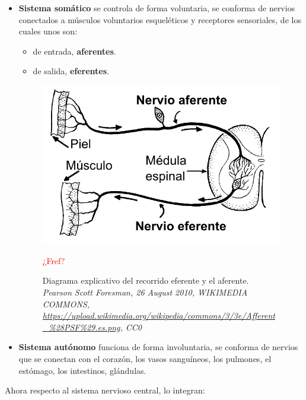 \begin{itemize}
 \item \textbf{Sistema somático} se controla de forma voluntaria, se conforma de nervios conectados a músculos voluntarios esqueléticos y receptores sensoriales, de los cuales unos son:
 \begin{itemize}
  \item de entrada, \textbf{aferentes}.
  \item de salida, \textbf{eferentes}.
 \end{itemize}


 \begin{figure}[h]
 \centering
 \includegraphics[scale=0.5]{../Figuras/afferent_efferent.png}
 \caption{Diagrama explicativo del recorrido eferente y el aferente.  \textit{Pearson Scott Foresman, 26 August 2010, WIKIMEDIA COMMONS, \url{https://upload.wikimedia.org/wikipedia/commons/3/3e/Afferent_\%28PSF\%29.es.png}, CC0}}  \textcolor{red}{¿Fref?}
 \label{axonesSA}
 \end{figure} 
 
\item \textbf{Sistema autónomo} funciona de forma involuntaria, se conforma de nervios que se conectan con el corazón, los vasos sanguíneos, los pulmones, el estómago, los intestinos, glándulas.
\end{itemize}


Ahora respecto al sistema nervioso central, lo integran:


